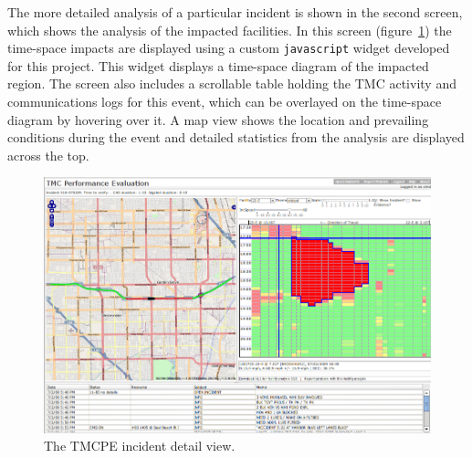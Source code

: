 \documentclass[12pt]{report}
\newif\ifuserguide %
\newcounter{time}
\newcounter{space}
\begin{document}
The more detailed analysis of a particular incident is shown in the second
screen, which shows the analysis of the impacted facilities.  In this screen
(figure~\ref{fig:tmcpe-incident-detail-interface}) the time-space impacts are
displayed using a custom \texttt{javascript} widget developed for this project.
This widget displays a time-space diagram of the impacted region.  The screen
also includes a scrollable table holding the TMC activity and communications
logs for this event, which can be overlayed on the time-space diagram by
hovering over it.  A map view shows the location and prevailing conditions
during the event and detailed statistics from the analysis are displayed across
the top.
\begin{figure}[t]
  \begin{center}
    \includegraphics[width=\textwidth]{images/tmcpe-incident-detail.png}
    \caption{The TMCPE incident detail view.}
    \label{fig:tmcpe-incident-detail-interface}
  \end{center}
\end{figure}

\ifuserguide%
Additional detail of the user interface is provided in
appendix~\ref{chap:user-guide}.  
%
\fi


\end{document}
